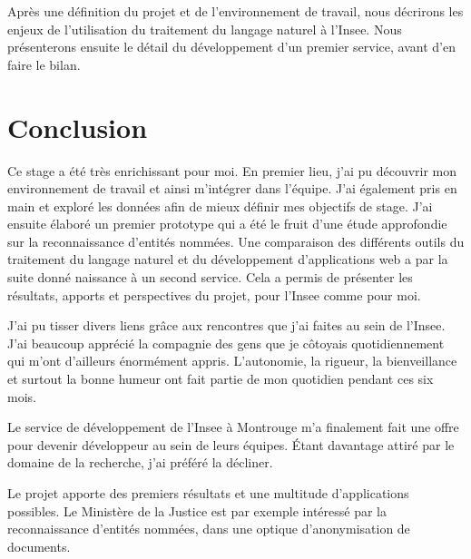 \documentclass[11pt, oneside, a4paper, titlepage, french]{article}
\begin{document}
Après une définition du projet et de l'environnement de travail, nous décrirons les enjeux de l'utilisation du traitement du langage naturel à l'Insee. Nous présenterons ensuite le détail du développement d'un premier service, avant d'en faire le bilan.
\newpage


\newpage

\newpage

\newpage

\newpage

\section*{Conclusion}

Ce stage a été très enrichissant pour moi. En premier lieu, j'ai pu découvrir mon environnement de travail et ainsi m'intégrer dans l'équipe. J'ai également pris en main et exploré les données afin de mieux définir mes objectifs de stage. J'ai ensuite élaboré un premier prototype qui a été le fruit d'une étude approfondie sur la reconnaissance d'entités nommées. Une comparaison des différents outils du traitement du langage naturel et du développement d'applications web a par la suite donné naissance à un second service. Cela a permis de présenter les résultats, apports et perspectives du projet, pour l'Insee comme pour moi.
\newline

J'ai pu tisser divers liens grâce aux rencontres que j'ai faites au sein de l'Insee. J'ai beaucoup apprécié la compagnie des gens que je côtoyais quotidiennement qui m'ont d'ailleurs énormément appris. L'autonomie, la rigueur, la bienveillance et surtout la bonne humeur ont fait partie de mon quotidien pendant ces six mois.
\newline

Le service de développement de l'Insee à Montrouge m'a finalement fait une offre pour devenir développeur au sein de leurs équipes. Étant davantage attiré par le domaine de la recherche, j'ai préféré la décliner.
\newline

Le projet apporte des premiers résultats et une multitude d'applications possibles. Le Ministère de la Justice est par exemple intéressé par la reconnaissance d'entités nommées, dans une optique d'anonymisation de documents.
\newpage

\listoffigures
\vspace{20pt}
\listoftables
\newpage



\newpage


\end{document}
